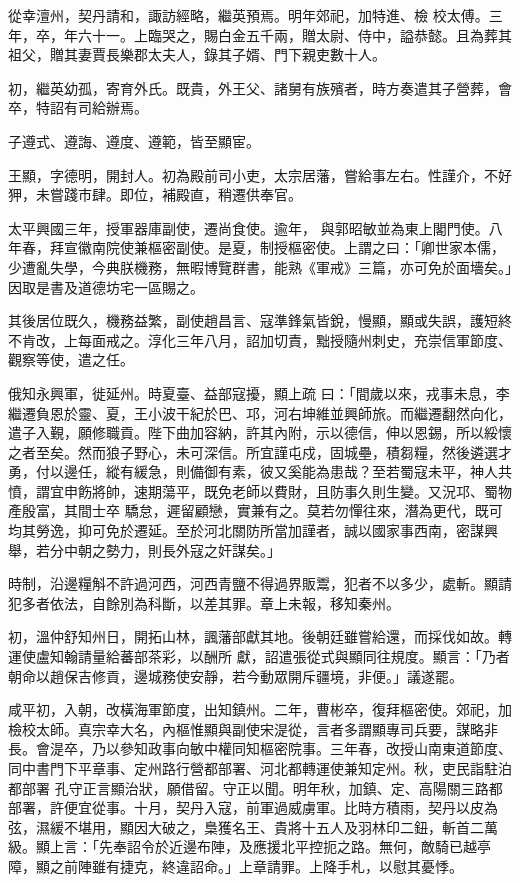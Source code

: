 \begin{pinyinscope}
 從幸澶州，契丹請和，諏訪經略，繼英預焉。明年郊祀，加特進、檢
 校太傅。三年，卒，年六十一。上臨哭之，賜白金五千兩，贈太尉、侍中，謚恭懿。且為葬其祖父，贈其妻賈長樂郡太夫人，錄其子婿、門下親吏數十人。



 初，繼英幼孤，寄育外氏。既貴，外王父、諸舅有族殯者，時方奏遣其子營葬，會卒，特詔有司給辦焉。



 子遵式、遵誨、遵度、遵範，皆至顯宦。



 王顯，字德明，開封人。初為殿前司小吏，太宗居藩，嘗給事左右。性謹介，不好狎，未嘗踐市肆。即位，補殿直，稍遷供奉官。



 太平興國三年，授軍器庫副使，遷尚食使。逾年，
 與郭昭敏並為東上閣門使。八年春，拜宣徽南院使兼樞密副使。是夏，制授樞密使。上謂之曰：「卿世家本儒，少遭亂失學，今典朕機務，無暇博覽群書，能熟《軍戒》三篇，亦可免於面墻矣。」因取是書及道德坊宅一區賜之。



 其後居位既久，機務益繁，副使趙昌言、寇準鋒氣皆銳，慢顯，顯或失誤，護短終不肯改，上每面戒之。淳化三年八月，詔加切責，黜授隨州刺史，充崇信軍節度、觀察等使，遣之任。



 俄知永興軍，徙延州。時夏臺、益部寇擾，顯上疏
 曰：「間歲以來，戎事未息，李繼遷負恩於靈、夏，王小波干紀於巴、邛，河右坤維並興師旅。而繼遷翻然向化，遣子入覲，願修職貢。陛下曲加容納，許其內附，示以德信，伸以恩錫，所以綏懷之者至矣。然而狼子野心，未可深信。所宜謹屯戍，固城壘，積芻糧，然後遴選才勇，付以邊任，縱有緩急，則備御有素，彼又奚能為患哉？至若蜀寇未平，神人共憤，謂宜申飭將帥，速期蕩平，既免老師以費財，且防事久則生變。又況邛、蜀物產殷富，其間士卒
 驕怠，遲留顧戀，實兼有之。莫若勿憚往來，潛為更代，既可均其勞逸，抑可免於遷延。至於河北關防所當加謹者，誠以國家事西南，密謀興舉，若分中朝之勢力，則長外寇之奸謀矣。」



 時制，沿邊糧斛不許過河西，河西青鹽不得過界販鬻，犯者不以多少，處斬。顯請犯多者依法，自餘別為科斷，以差其罪。章上未報，移知秦州。



 初，溫仲舒知州日，開拓山林，諷藩部獻其地。後朝廷雖嘗給還，而採伐如故。轉運使盧知翰請量給蕃部茶彩，以酬所
 獻，詔遣張從式與顯同往規度。顯言：「乃者朝命以趙保吉修貢，邊城務使安靜，若今動眾開斥疆境，非便。」議遂罷。



 咸平初，入朝，改橫海軍節度，出知鎮州。二年，曹彬卒，復拜樞密使。郊祀，加檢校太師。真宗幸大名，內樞惟顯與副使宋湜從，言者多謂顯專司兵要，謀略非長。會湜卒，乃以參知政事向敏中權同知樞密院事。三年春，改授山南東道節度、同中書門下平章事、定州路行營都部署、河北都轉運使兼知定州。秋，吏民詣駐泊都部署
 孔守正言顯治狀，願借留。守正以聞。明年秋，加鎮、定、高陽關三路都部署，許便宜從事。十月，契丹入寇，前軍過威虜軍。比時方積雨，契丹以皮為弦，濕緩不堪用，顯因大破之，梟獲名王、貴將十五人及羽林印二鈕，斬首二萬級。顯上言：「先奉詔令於近邊布陣，及應援北平控扼之路。無何，敵騎已越亭障，顯之前陣雖有捷克，終違詔命。」上章請罪。上降手札，以慰其憂悸。




\end{pinyinscope}
